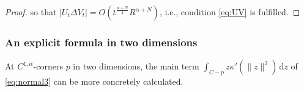 \documentclass[graybox]{svmult}
\newcommand{\ep}{\varepsilon}
\renewcommand{\d}{\mathrm{d}}  %
\newcommand{\R}{\mathbb{R}}  %
\renewcommand{\AA}{A}  %
\newcommand{\pp}{p}
\begin{document}
\begin{proof}
so that $|U_t\Delta V_t| = O(t^\frac{\alpha+N}{2}R^{\alpha+N})$, i.e., condition \eqref{eq:UV} is fulfilled. %
\end{proof}





\subsubsection{An explicit formula in two dimensions}\label{sec:explicit}

At $C^{1,\alpha}$-corners $\pp$ in two dimensions, the main term $\int_{C-\pp} z \kappa'(\|z  \|^2) \,\d z$ of \eqref{eq:normal3}  can be more concretely calculated. 
\end{document}
